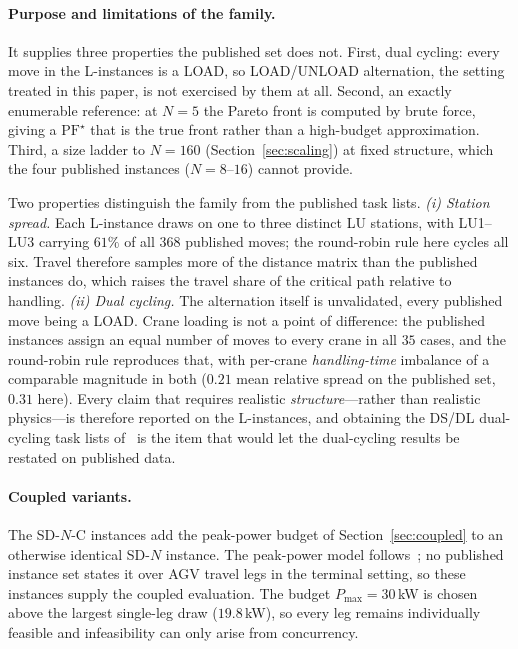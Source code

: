\documentclass[11pt]{article}
\begin{document}
\paragraph{Purpose and limitations of the family.} It supplies three properties the
published set does not. First, dual cycling: every move in the \textsf{L}-instances is a
\textsf{LOAD}, so LOAD/UNLOAD alternation, the setting treated in this paper, is not
exercised by them at all. Second, an exactly enumerable reference: at $N=5$ the Pareto front
is computed by brute force, giving a $\mathrm{PF}^\star$ that is the true front rather than a
high-budget approximation. Third, a size ladder to $N=160$ (Section~\ref{sec:scaling}) at
fixed structure, which the four published instances ($N=8$--$16$) cannot provide.

Two properties distinguish the family from the published task lists. \emph{(i) Station
spread.} Each \textsf{L}-instance draws on one to three distinct \textsf{LU} stations, with
\textsf{LU1}--\textsf{LU3} carrying $61\%$ of all $368$ published moves; the round-robin
rule here cycles all six. Travel therefore samples more of the distance matrix than the
published instances do, which raises the travel share of the critical path relative to
handling. \emph{(ii) Dual cycling.} The alternation itself is unvalidated, every published
move being a \textsf{LOAD}. Crane loading is not a point of difference: the published
instances assign an equal number of moves to every crane in all $35$ cases, and the
round-robin rule reproduces that, with per-crane \emph{handling-time} imbalance of a
comparable magnitude in both ($0.21$ mean relative spread on the published set, $0.31$
here). Every claim that requires realistic \emph{structure}---rather than realistic
physics---is therefore reported on the \textsf{L}-instances, and obtaining the
\textsf{DS}/\textsf{DL} dual-cycling task lists of~\cite{homayouni2022book} is the item that
would let the dual-cycling results be restated on published data.

\paragraph{Coupled variants.} The \textsf{SD-$N$-C} instances add the peak-power budget
of Section~\ref{sec:coupled} to an otherwise identical \textsf{SD-$N$} instance. The
peak-power model follows~\cite{homayouni2025peakpower}; no published instance set states it
over AGV travel legs in the terminal setting, so these instances supply the coupled
evaluation. The budget $P_{\max}=30$\,kW is chosen above the largest single-leg draw
($19.8$\,kW), so every leg remains individually feasible and infeasibility can only arise
from concurrency.
\end{document}
